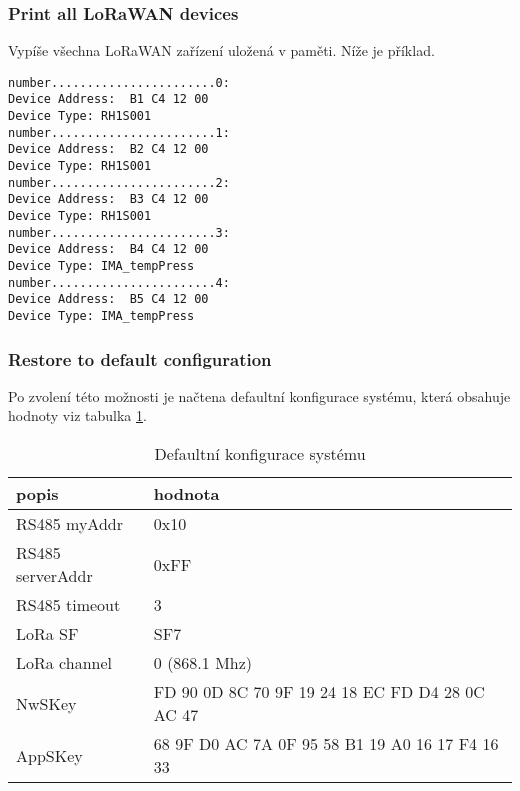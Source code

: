 \subsubsection{Print all LoRaWAN devices}
Vypíše všechna LoRaWAN zařízení uložená v paměti. Níže je příklad.


\begin{lstlisting}
number.......................0:
Device Address:  B1 C4 12 00
Device Type: RH1S001
number.......................1:
Device Address:  B2 C4 12 00
Device Type: RH1S001
number.......................2:
Device Address:  B3 C4 12 00
Device Type: RH1S001
number.......................3:
Device Address:  B4 C4 12 00
Device Type: IMA_tempPress
number.......................4:
Device Address:  B5 C4 12 00
Device Type: IMA_tempPress
\end{lstlisting}



\subsubsection{Restore to default configuration}
Po zvolení této možnosti je načtena defaultní konfigurace systému, která obsahuje hodnoty viz tabulka \ref{table:5}.

\begin{table}[!h]
    \centering
    \begin{tabular}{ |l|l| }
     \hline

     popis              & hodnota         \\ \hline \hline
     RS485 myAddr       & 0x10            \\ \hline
     RS485 serverAddr   & 0xFF            \\ \hline
     RS485 timeout      & 3               \\ \hline
     LoRa SF            & SF7             \\ \hline
     LoRa channel       & 0 (868.1 Mhz)   \\ \hline
     NwSKey             & FD 90 0D 8C 70 9F 19 24 18 EC FD D4 28 0C AC 47  \\ \hline
     AppSKey            & 68 9F D0 AC 7A 0F 95 58 B1 19 A0 16 17 F4 16 33  \\ \hline

    \end{tabular}
    \caption{Defaultní konfigurace systému}
    \label{table:5}
\end{table}


\newpage
